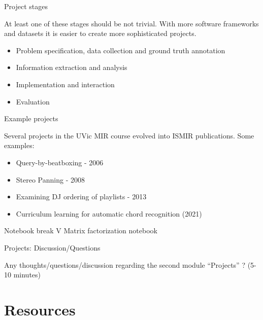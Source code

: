 \documentclass[12pt]{beamer}
\begin{document}
  
\begin{frame}{Project stages}

  At least one of these stages should be not trivial. With more software
  frameworks and datasets it is easier to create more sophisticated projects. 

  \begin{itemize}
  \item{Problem specification, data collection and ground truth annotation}
  \item{Information extraction and analysis}
  \item{Implementation and interaction}
  \item{Evaluation} 
  \end{itemize} 
  
\end{frame}


\begin{frame}{Example projects}

  Several projects in the UVic MIR course evolved into ISMIR publications.
  Some examples:
  
  \begin{itemize}
  \item{Query-by-beatboxing - 2006}
  \item{Stereo Panning - 2008}
  \item{Examining DJ ordering of playlists - 2013}
  \item{Curriculum learning for automatic chord recognition (2021)}
    
  \end{itemize} 

  
\end{frame} 

\begin{frame}{Notebook break V}
  Matrix factorization notebook 
\end{frame}

\begin{frame}{Projects: Discussion/Questions}

  Any thoughts/questions/discussion regarding the second module ``Projects'' ? (5-10 minutes) 
  
\end{frame}



\section{Resources}
\end{document}
